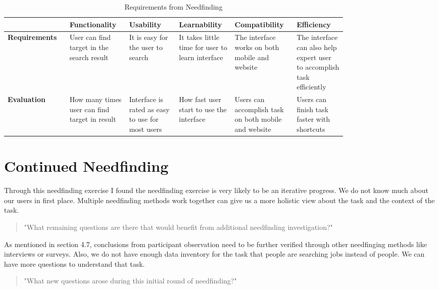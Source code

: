 \documentclass[
	letterpaper, %
]{jdf}
\begin{document}
\begin{table}[h] %
	\caption{Requirements from Needfinding}
	\small %
	\centering %
	\begin{tabular}{L{0.13\linewidth} L{0.13\linewidth} L{0.13\linewidth} L{0.13\linewidth} L{0.13\linewidth} L{0.13\linewidth}}
		\textbf{\-} & \textbf{Functionality} & \textbf{Usability} & \textbf{Learnability} & \textbf{Compatibility} & \textbf{Efficiency}\\
		\toprule[0.5pt]
		\textbf{Requirements} & User can find target in the search result & It is easy for the user to search & It takes little time for user to learn interface & The interface works on both mobile and website & The interface can also help expert user to accomplish task efficiently \\
		\midrule
		\textbf{Evaluation} & How many times user can find target in result & Interface is rated as easy to use for most users & How fast user start to use the interface & Users can accomplish task on both mobile and website & Users can finish task faster with shortcuts \\
	\end{tabular}
\end{table}

\section{Continued Needfinding}

Through this needfinding exercise I found the needfinding exercise is very likely to be an iterative progress. We do not know much about our users in first place. Multiple needfinding methods work together can give us a more holistic view about the task and the context of the task. 

\begin{quotation}
"What remaining questions are there that would benefit from additional needfinding investigation?"
\end{quotation}

As mentioned in section 4.7, conclusions from participant observation need to be further verified through other needfinging methods like interviews or surveys. Also, we do not have enough data inventory for the task that people are searching jobs instead of people. We can have more questions to understand that task.

\begin{quotation}
"What new questions arose during this initial round of needfinding?"
\end{quotation}
\end{document}
